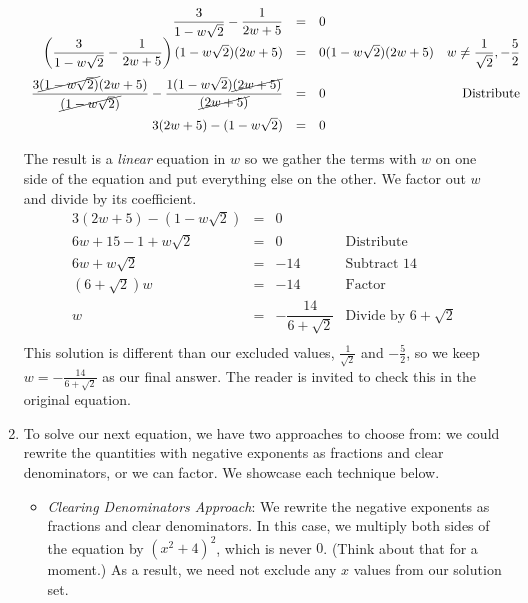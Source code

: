 \documentclass{ximera}
\begin{document}
\begin{example}
\begin{enumerate}
\[\begin{array}{rclr}
 \dfrac{3}{1 - w\sqrt{2}} - \dfrac{1}{2w+5} & = &  0 & \\

\left(\dfrac{3}{1 - w\sqrt{2}} - \dfrac{1}{2w+5}\right)(1 - w\sqrt{2})(2w+5) & = &  0 (1 - w\sqrt{2})(2w+5)  & w \neq \dfrac{1}{\sqrt{2}}, -\dfrac{5}{2} \\ [12pt]

\dfrac{3\cancel{(1 - w\sqrt{2})}(2w+5) }{\cancel{(1 - w\sqrt{2})}}- \dfrac{1(1 - w\sqrt{2})\cancel{(2w+5)}}{\cancel{(2w+5)}} & = & 0 & \text{Distribute} \\ [12pt]

3(2w+5) - (1-w\sqrt{2}) & = & 0 & \\  \end{array}\]

The result is a \textit{linear} equation in $w$ so we gather the terms with $w$ on one side of the equation and put everything else on the other.  We factor out $w$ and divide by its coefficient. \[ \begin{array}{rclr}

3(2w+5) - (1-w\sqrt{2}) & = & 0 & \\

6w + 15 - 1 + w\sqrt{2} & = & 0 & \text{Distribute} \\

6w + w\sqrt{2} & = & -14 & \text{Subtract $14$} \\

(6 + \sqrt{2})w & = & -14 & \text{Factor} \\

w & = & -\dfrac{14}{6 + \sqrt{2}} & \text{Divide by $6 + \sqrt{2}$} \\ 

\end{array}\] This solution is different than our excluded values, $\frac{1}{\sqrt{2}}$ and $-\frac{5}{2}$, so we keep $w = -\frac{14}{6 + \sqrt{2}}$ as our final answer.  The reader is invited to check this in the original equation.

\item  To solve our next equation, we have two approaches to choose from:  we could rewrite the quantities with negative exponents as fractions and clear denominators, or we can factor.  We showcase each technique below.

\begin{itemize}

\item \textit{Clearing Denominators Approach}:  We rewrite the negative exponents as fractions and clear denominators.  In this case, we multiply both sides of the equation by $(x^2+4)^2$, which is never $0$. (Think about that for a moment.)  As a result, we need not exclude any $x$ values from our solution set.\[ \begin{array}{rclr}


\end{array}\]
\end{itemize}
\end{enumerate}
\end{example}
\end{document}
